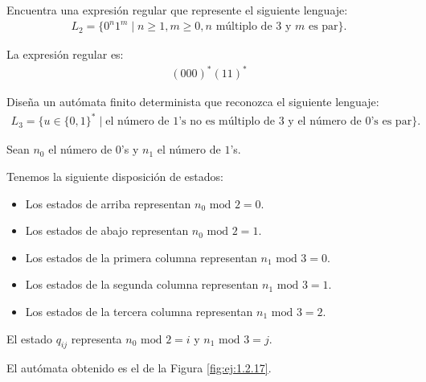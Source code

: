 \begin{ejercicio}
    Encuentra una expresión regular que represente el siguiente lenguaje:
    \begin{align*}
        L_2 = \{0^n1^m \mid n \geq 1, m \geq 0, n \text{ múltiplo de } 3 \text{ y } m \text{ es par}\}.
    \end{align*}

    La expresión regular es:
    \begin{align*}
        (000)^*(11)^*
    \end{align*}
\end{ejercicio}

\begin{ejercicio} \label{ej:1.2.17}
    Diseña un autómata finito determinista que reconozca el siguiente lenguaje:
    \begin{align*}
        L_3 = \{u \in \{0, 1\}^* \mid \text{el número de $1$'s no es múltiplo de } 3 \text{ y el número de $0$'s es par}\}.
    \end{align*}

    Sean $n_0$ el número de $0$'s y $n_1$ el número de $1$'s.

    Tenemos la siguiente disposición de estados:
    \begin{itemize}
        \item Los estados de arriba representan $n_0 \text{ mod } 2 = 0$.
        \item Los estados de abajo representan $n_0 \text{ mod } 2 = 1$.
        \item Los estados de la primera columna representan $n_1 \text{ mod } 3 = 0$.
        \item Los estados de la segunda columna representan $n_1 \text{ mod } 3 = 1$.
        \item Los estados de la tercera columna representan $n_1 \text{ mod } 3 = 2$.
    \end{itemize}

    El estado $q_{ij}$ representa $n_0 \text{ mod } 2 = i$ y $n_1 \text{ mod } 3 = j$.
    
    El autómata obtenido es el de la Figura \ref{fig:ej:1.2.17}.
    \begin{figure}
        \centering
\end{figure}
\end{ejercicio}
